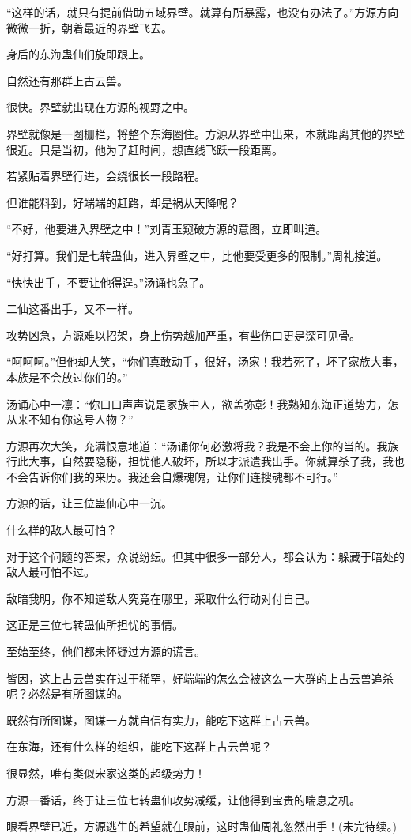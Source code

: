 \begin{this_body}
“这样的话，就只有提前借助五域界壁。就算有所暴露，也没有办法了。”方源方向微微一折，朝着最近的界壁飞去。

身后的东海蛊仙们旋即跟上。

自然还有那群上古云兽。

很快。界壁就出现在方源的视野之中。

界壁就像是一圈栅栏，将整个东海圈住。方源从界壁中出来，本就距离其他的界壁很近。只是当初，他为了赶时间，想直线飞跃一段距离。

若紧贴着界壁行进，会绕很长一段路程。

但谁能料到，好端端的赶路，却是祸从天降呢？

“不好，他要进入界壁之中！”刘青玉窥破方源的意图，立即叫道。

“好打算。我们是七转蛊仙，进入界壁之中，比他要受更多的限制。”周礼接道。

“快快出手，不要让他得逞。”汤诵也急了。

二仙这番出手，又不一样。

攻势凶急，方源难以招架，身上伤势越加严重，有些伤口更是深可见骨。

“呵呵呵。”但他却大笑，“你们真敢动手，很好，汤家！我若死了，坏了家族大事，本族是不会放过你们的。”

汤诵心中一凛：“你口口声声说是家族中人，欲盖弥彰！我熟知东海正道势力，怎从来不知有你这号人物？”

方源再次大笑，充满恨意地道：“汤诵你何必激将我？我是不会上你的当的。我族行此大事，自然要隐秘，担忧他人破坏，所以才派遣我出手。你就算杀了我，我也不会告诉你们我的来历。我还会自爆魂魄，让你们连搜魂都不可行。”

方源的话，让三位蛊仙心中一沉。

什么样的敌人最可怕？

对于这个问题的答案，众说纷纭。但其中很多一部分人，都会认为：躲藏于暗处的敌人最可怕不过。

敌暗我明，你不知道敌人究竟在哪里，采取什么行动对付自己。

这正是三位七转蛊仙所担忧的事情。

至始至终，他们都未怀疑过方源的谎言。

皆因，这上古云兽实在过于稀罕，好端端的怎么会被这么一大群的上古云兽追杀呢？必然是有所图谋的。

既然有所图谋，图谋一方就自信有实力，能吃下这群上古云兽。

在东海，还有什么样的组织，能吃下这群上古云兽呢？

很显然，唯有类似宋家这类的超级势力！

方源一番话，终于让三位七转蛊仙攻势减缓，让他得到宝贵的喘息之机。

眼看界壁已近，方源逃生的希望就在眼前，这时蛊仙周礼忽然出手！(未完待续。)

\end{this_body}

